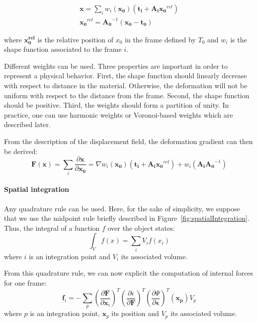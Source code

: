 \begin{equation}
\begin{array}{l}
\displaystyle \mathbf{x} = \sum_{i} w_{i}(\mathbf{x_{0}})\left(\mathbf{t_{i}}+\mathbf{A_{i}}\mathbf{x_{0}}^{rel}\right) \\
\displaystyle \mathbf{x_{0}}^{rel} = \mathbf{A_{0}}^{-1}\left( \mathbf{x_{0}} - \mathbf{t_{0}} \right)
\end{array}
\end{equation}

where $\mathbf{x_{0}^{rel}}$ is the relative position of $x_{0}$ in the frame defined by $T_{0}$ and $w_{i}$ is the shape function associated to the frame $i$.

Different weights can be used. Three properties are important in order to represent a physical behavior. First, the shape function should linearly decrease with respect to distance in the material. Otherwise, the deformation will not be uniform with respect to the distance from the frame. Second, the shape function should be positive. Third, the weights should form a partition of unity. In practice, one can use harmonic weights or Voronoi-based weights which are described later.

From the description of the displacement field, the deformation gradient can then be derived:
\begin{equation}
\displaystyle
\mathbf{F}\left(\mathbf{x}\right) = \sum_{i} \frac{\partial \mathbf{x}}{\partial \mathbf{x_{0}}} =
\nabla w_{i}(\mathbf{x_{0}}) \left( \mathbf{t_{i}}+\mathbf{A_{i}}\mathbf{x_{0}}^{rel}\right) + 
w_{i}\left( \mathbf{A_{i}}\mathbf{A_{0}}^{-1} \right)
\end{equation}

\paragraph{Spatial integration}

Any quadrature rule can be used. Here, for the sake of simplicity, we suppose that we use the midpoint rule briefly described in Figure~\ref{fig:spatialIntegration}. Thus, the integral of a function $f$ over the object states:
\begin{equation}
\displaystyle
\int_{V} f(x)  = \sum_{i} V_{i} f(x_{i})
\end{equation}
where $i$ is an integration point and $V_{i}$ its associated volume.

From this quadrature rule, we can now explicit the computation of internal forces for one frame:
\begin{equation}
\label{eq:frameForceComputation}
\displaystyle
\mathbf{f}_{i} =
- \sum_{p}
\left( \frac{\partial \mathbf{F}}{\partial \mathbf{x}_{i}} \right)^{T}
\left( \frac{\partial \epsilon}{\partial \mathbf{F}} \right)^{T}
\left( \frac{\partial \Psi}{\partial \mathbf{\epsilon}} \right)^{T} \left(\mathbf{x_{p}}\right) V_{p} 
\end{equation}
where $p$ is an integration point, $\mathbf{x}_{p}$ its position and $V_{p}$ its associated volume.

